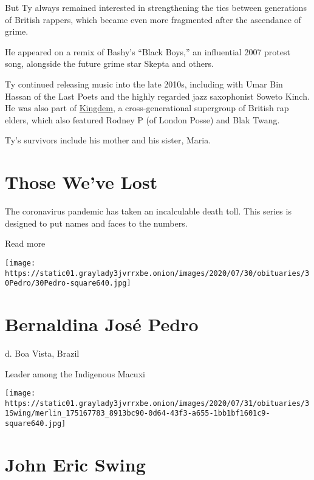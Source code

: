 But Ty always remained interested in strengthening the ties between
generations of British rappers, which became even more fragmented after
the ascendance of grime.

He appeared on a remix of Bashy's ``Black Boys,'' an influential 2007
protest song, alongside the future grime star Skepta and others.

Ty continued releasing music into the late 2010s, including with Umar
Bin Hassan of the Last Poets and the highly regarded jazz saxophonist
Soweto Kinch. He was also part of
\href{https://kingdemrodneyptyandblaktwang.bandcamp.com/album/the-kingdem-ep}{Kingdem},
a cross-generational supergroup of British rap elders, which also
featured Rodney P (of London Posse) and Blak Twang.

Ty's survivors include his mother and his sister, Maria.

\href{https://www.nytimes3xbfgragh.onion/interactive/2020/obituaries/people-died-coronavirus-obituaries.html?action=click\&pgtype=Article\&state=default\&region=BELOW_MAIN_CONTENT\&context=covid_obits_promo}{}

\hypertarget{those-weve-lost}{%
\section{Those We've Lost}\label{those-weve-lost}}

The coronavirus pandemic has taken an incalculable death toll. This
series is designed to put names and faces to the numbers.

Read more

\texttt{[image: https://static01.graylady3jvrrxbe.onion/images/2020/07/30/obituaries/30Pedro/30Pedro-square640.jpg]}

\hypertarget{bernaldina-josuxe9-pedro}{%
\section{Bernaldina José Pedro}\label{bernaldina-josuxe9-pedro}}

d. Boa Vista, Brazil

Leader among the Indigenous Macuxi

\texttt{[image: https://static01.graylady3jvrrxbe.onion/images/2020/07/31/obituaries/31Swing/merlin\_175167783\_8913bc90-0d64-43f3-a655-1bb1bf1601c9-square640.jpg]}

\hypertarget{john-eric-swing}{%
\section{John Eric Swing}\label{john-eric-swing}}

